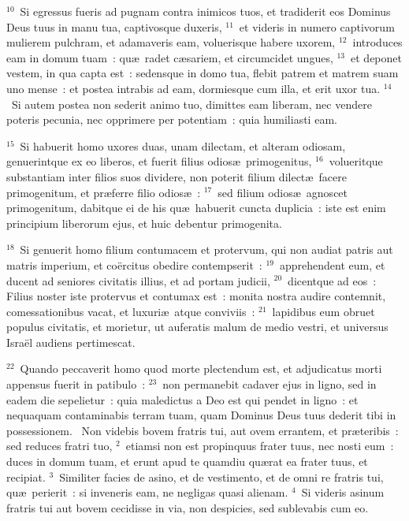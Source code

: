${}^{10}$~Si egressus fueris ad pugnam contra inimicos tuos, et tradiderit eos Dominus Deus tuus in manu tua, captivosque duxeris,
${}^{11}$~et videris in numero captivorum mulierem pulchram, et adamaveris eam, voluerisque habere uxorem,
${}^{12}$~introduces eam in domum tuam~: qu\ae\ radet c\ae sariem, et circumcidet ungues,
${}^{13}$~et deponet vestem, in qua capta est~: sedensque in domo tua, flebit patrem et matrem suam uno mense~: et postea intrabis ad eam, dormiesque cum illa, et erit uxor tua.
${}^{14}$~Si autem postea non sederit animo tuo, dimittes eam liberam, nec vendere poteris pecunia, nec opprimere per potentiam~: quia humiliasti eam.


${}^{15}$~Si habuerit homo uxores duas, unam dilectam, et alteram odiosam, genuerintque ex eo liberos, et fuerit filius odios\ae\ primogenitus,
${}^{16}$~volueritque substantiam inter filios suos dividere, non poterit filium dilect\ae\ facere primogenitum, et pr\ae ferre filio odios\ae~:
${}^{17}$~sed filium odios\ae\ agnoscet primogenitum, dabitque ei de his qu\ae\ habuerit cuncta duplicia~: iste est enim principium liberorum ejus, et huic debentur primogenita.


${}^{18}$~Si genuerit homo filium contumacem et protervum, qui non audiat patris aut matris imperium, et co\"ercitus obedire contempserit~:
${}^{19}$~apprehendent eum, et ducent ad seniores civitatis illius, et ad portam judicii,
${}^{20}$~dicentque ad eos~: Filius noster iste protervus et contumax est~: monita nostra audire contemnit, comessationibus vacat, et luxuri\ae\ atque conviviis~:
${}^{21}$~lapidibus eum obruet populus civitatis, et morietur, ut auferatis malum de medio vestri, et universus Isra\"el audiens pertimescat.


${}^{22}$~Quando peccaverit homo quod morte plectendum est, et adjudicatus morti appensus fuerit in patibulo~:
${}^{23}$~non permanebit cadaver ejus in ligno, sed in eadem die sepelietur~: quia maledictus a Deo est qui pendet in ligno~: et nequaquam contaminabis terram tuam, quam Dominus Deus tuus dederit tibi in possessionem.
~Non videbis bovem fratris tui, aut ovem errantem, et pr\ae teribis~: sed reduces fratri tuo,
${}^{2}$~etiamsi non est propinquus frater tuus, nec nosti eum~: duces in domum tuam, et erunt apud te quamdiu qu\ae rat ea frater tuus, et recipiat.
${}^{3}$~Similiter facies de asino, et de vestimento, et de omni re fratris tui, qu\ae\ perierit~: si inveneris eam, ne negligas quasi alienam.
${}^{4}$~Si videris asinum fratris tui aut bovem cecidisse in via, non despicies, sed sublevabis cum eo.


